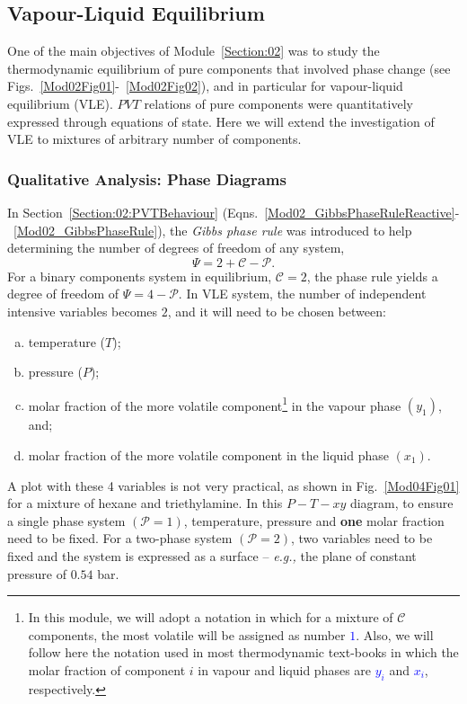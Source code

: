 \documentclass[12pts,a4paper,amsmath,amssymb,floatfix]{article}%
\newcommand{\blue}{\textcolor{blue}}
\newcommand{\eg}{{\it e.g., }}
\begin{document}
\subsection{Vapour-Liquid Equilibrium}\label{Section:04:VLE}

One of the main objectives of Module~\ref{Section:02} was to study the thermodynamic equilibrium of pure components that involved phase change (see Figs.~\ref{Mod02Fig01}-~\ref{Mod02Fig02}), and in particular for vapour-liquid equilibrium (VLE). $PVT$ relations of pure components were quantitatively expressed through equations of state. Here we will extend the investigation of VLE to mixtures of arbitrary number of components.

\subsubsection{Qualitative Analysis: Phase Diagrams}\label{Section:04:PhaseDiagrams}
In Section~\ref{Section:02:PVTBehaviour} (Eqns.~\ref{Mod02_GibbsPhaseRuleReactive}-~\ref{Mod02_GibbsPhaseRule}), the {\it Gibbs phase rule} was introduced to help determining the number of degrees of freedom of any system,
    \begin{displaymath}
        \Psi = 2 + \mathcal{C} - \mathcal{P}.
    \end{displaymath}
For a binary components system in equilibrium, $\mathcal{C}=2$, the phase rule yields a degree of freedom of $\Psi=4-\mathcal{P}$. In VLE system, the number of independent intensive variables becomes $2$, and it will need to be chosen between:
\begin{enumerate}[a)]
   \item temperature ($T$);
   \item pressure ($P$);
   \item molar fraction of the more volatile component\footnote{In this module, we will adopt a notation in which for a mixture of $\mathcal{C}$ components, the most volatile will be assigned as number \blue{$1$}. Also, we will follow here the notation used in most thermodynamic text-books in which the molar fraction of component $i$ in vapour and liquid phases are \blue{$y_{i}$} and \blue{$x_{i}$}, respectively.} in the vapour phase $\left(y_{1}\right)$, and;
   \item molar fraction of the more volatile component in the liquid phase $\left(x_{1}\right)$.
\end{enumerate}
A plot with these 4 variables is not very practical, as shown in Fig.~\ref{Mod04Fig01} for a mixture of hexane and triethylamine. In this $P-T-xy$ diagram, to ensure a single phase system $\left(\mathcal{P}=1\right)$, temperature, pressure and {\bf one} molar fraction need to be fixed. For a two-phase system $\left(\mathcal{P}=2\right)$, two variables need to be fixed and the system is expressed as a surface -- \eg the plane of constant pressure of $0.54$ bar. %
\end{document}
